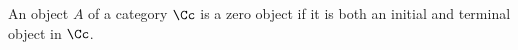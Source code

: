\begin{defin}
  An object $A$ of a category $\Cc$ is a zero object if it is both an initial and terminal object
  in $\Cc$.
\end{defin}